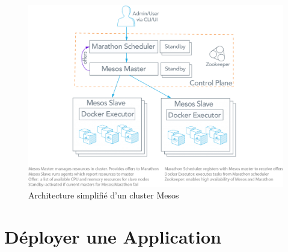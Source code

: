 \documentclass[11pt,fleqn]{book} %
\begin{document}
\begin{figure}[H]\centering
\renewcommand{\figurename}{Schéma}
\includegraphics[scale=0.3,trim={0 5cm 0 0},clip]{Pictures/Comparaison/mesos-architecture.png}
\captionsetup{margin=1.5cm,format=hang,justification=justified}
\caption[]{Architecture simplifié d'un cluster Mesos \newline}
\end{figure}



\chapter{Déployer une Application}
\label{A}
\vspace{-2cm}
\end{document}
